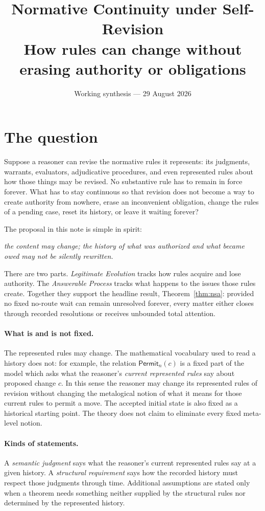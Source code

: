 \documentclass[11pt]{article}
\title{Normative Continuity under Self-Revision\\[3pt]
\large How rules can change without erasing authority or obligations}
\author{}
\date{Working synthesis --- 29 August 2026}
\theoremstyle{definition}
\theoremstyle{remark}
\newcommand{\Permit}{\mathsf{Permit}}
\begin{document}
\maketitle

\section*{The question}

Suppose a reasoner can revise the normative rules it represents: its judgments,
warrants, evaluators, adjudicative procedures, and even represented rules about
how those things may be revised. No substantive rule has to remain in force
forever. What has to stay continuous so that revision does not become a way to
create authority from nowhere, erase an inconvenient obligation, change the
rules of a pending case, reset its history, or leave it waiting forever?

The proposal in this note is simple in spirit:
\begin{center}
\emph{the content may change; the history of what was authorized and what became owed may not be silently rewritten.}
\end{center}

There are two parts. \emph{Legitimate Evolution} tracks how rules acquire and
lose authority. The \emph{Answerable Process} tracks what happens to the issues
those rules create. Together they support the headline result, Theorem~\ref{thm:nsa}:
provided no fixed no-route wait can remain unresolved forever, every matter
either closes through recorded resolutions or receives unbounded total
attention.

\paragraph{What is and is not fixed.}
The represented rules may change. The mathematical vocabulary used to read a
history does not: for example, the relation $\Permit_n(c)$ is a fixed part of
the model which asks what the reasoner's \emph{current represented rules} say
about proposed change $c$. In this sense the reasoner may change its represented
rules of revision without changing the metalogical notion of what it means for
those current rules to permit a move. The accepted initial state is also fixed
as a historical starting point. The theory does not claim to eliminate every
fixed meta-level notion.

\paragraph{Kinds of statements.}
A \emph{semantic judgment} says what the reasoner's current represented rules
say at a given history. A \emph{structural requirement} says how the recorded
history must respect those judgments through time. Additional assumptions are
stated only when a theorem needs something neither supplied by the structural
rules nor determined by the represented history.
\end{document}
